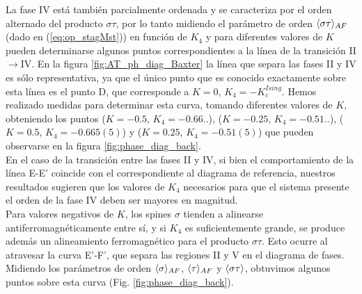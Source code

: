 La fase IV está también parcialmente ordenada y se caracteriza por el orden alternado del producto $\sigma\tau$, por lo tanto midiendo el parámetro de orden $\langle \sigma\tau \rangle_{AF}$
 (dado en (\ref{eq:op_stagMst})) en función de $K_{4}$ y para diferentes valores de $K$ pueden determinarse algunos puntos correspondientes a la línea de la transición II$\rightarrow$IV.
 En la figura \ref{fig:AT_ph_diag_Baxter} la línea que separa las fases II y IV es sólo representativa, ya que el único punto que es conocido exactamente sobre esta línea es el punto D,
 que corresponde a $K=0$, $K_{4}=-K_{c}^{Ising}$. Hemos realizado medidas para determinar esta curva, tomando diferentes valores de $K$, obteniendo los puntos
 ($K=-0.5$, $K_{4}=-0.66..$), ($K=-0.25$, $K_{4}=-0.51..$), ($K=0.5$, $K_{4}=-0.665(5)$) y ($K=0.25$, $K_{4}=-0.51(5)$) que pueden observarse en la figura \ref{fig:phase_diag_back}.\\

En el caso de la transici\'on entre las fases II y IV, si bien el comportamiento de la l\'inea E-E' coincide con el correspondiente
 al diagrama de referencia, nuestros resultados sugieren que los valores de $K_{4}$ necesarios para que el sistema presente el orden de la fase IV
 deben ser mayores en magnitud.\\

Para valores negativos de $K$, los spines $\sigma$ tienden a alinearse antiferromagnéticamente entre sí, y si $K_{4}$ es suficientemente grande, se produce además un alineamiento 
ferromagnético para el producto $\sigma\tau$. Esto ocurre al atravesar la curva E'-F', que separa las regiones II y V en el diagrama de fases. Midiendo los parámetros de orden
 $\langle \sigma \rangle_{AF}$, $\langle \tau \rangle_{AF}$ y $\langle \sigma\tau \rangle$, obtuvimos algunos puntos sobre esta curva (Fig. \ref{fig:phase_diag_back}).\\

